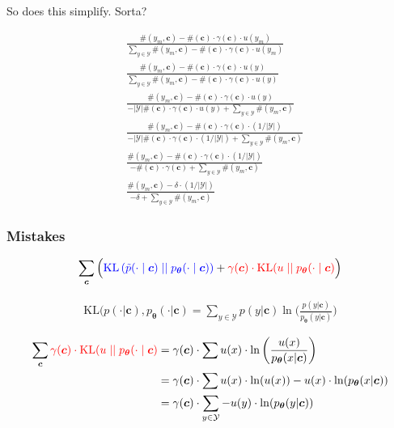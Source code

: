 \documentclass{article}
\newcommand{\KL}{\mathrm{KL}}
\newcommand{\uniform}{u}
\newcommand{\vtheta}{\boldsymbol{\theta}}
\newcommand{\model}{p_{\vtheta}}
\newcommand{\context}{\boldsymbol{c}}
\begin{document}
		So does this simplify. Sorta?
		
		\begin{align}
			&\frac{\#(y_m, \context) - \#(\context)\cdot \gamma(\context)\cdot u(y_m)}{\sum_{y\in\mathcal{Y}} \#(y_m, \context) - \#(\context)\cdot \gamma(\context)\cdot u(y_m)}  \\
			&\frac{\#(y_m, \context) - \#(\context)\cdot \gamma(\context)\cdot u(y)}{\sum_{y\in\mathcal{Y}} \#(y_m, \context) - \#(\context)\cdot \gamma(\context)\cdot u(y)}  \\
			&\frac{\#(y_m, \context) - \#(\context)\cdot \gamma(\context)\cdot u(y)}{ - |\mathcal{Y}| \#(\context)\cdot \gamma(\context)\cdot u(y) + \sum_{y\in\mathcal{Y}} \#(y_m, \context)} \\
			&\frac{\#(y_m, \context) - \#(\context)\cdot \gamma(\context)\cdot (1/|\mathcal{Y}|)}{ - |\mathcal{Y}| \#(\context)\cdot \gamma(\context)\cdot (1/|\mathcal{Y}|) + \sum_{y\in\mathcal{Y}} \#(y_m, \context)} \\
			&\frac{\#(y_m, \context) - \#(\context)\cdot \gamma(\context)\cdot (1/|\mathcal{Y}|)}{ -  \#(\context)\cdot \gamma(\context) + \sum_{y\in\mathcal{Y}} \#(y_m, \context)} \\
			&\frac{\#(y_m, \context) - \delta\cdot (1/|\mathcal{Y}|)}{ -  \delta + \sum_{y\in\mathcal{Y}} \#(y_m, \context)}
		\end{align}
		
		\subsubsection{Mistakes}
		
			\begin{align}
		  		\sum_{\context} \Big( {\color{blue} \KL\left(\tilde{p}(\cdot 			\mid \context) \mid\mid \model(\cdot \mid \context)					\right)} + {\color{red}\gamma(\context) \cdot 						\KL(\uniform \mid\mid \model(\cdot \mid \context)}\Big)
			\end{align}
			
			\begin{align}
				\KL(p(\cdot|\context), \model(\cdot|\context) = \sum_{y\in\mathcal{Y}} p(y|\context)\ln\bigg(\frac{p(y|\context)}{\model(y|\context)} \bigg)
			\end{align}
			
			\begin{align}
				\sum_{\context} {\color{red}\gamma(\context) \cdot 						\KL(\uniform \mid\mid \model(\cdot \mid \context)} &= \gamma(\context)\cdot\sum u(x)\cdot \ln\bigg(\frac{u(x)}{\model(x|\context)}\bigg)\\
			&= \gamma(\context)\cdot\sum u(x)\cdot\ln(u(x)) - u(x)\cdot\ln(\model(x|\context))\\
			&= \gamma(\context)\cdot\sum_{y\in\mathcal{Y}} - u(y)\cdot\ln(\model(y|\context))
			\end{align}
			
\end{document}
